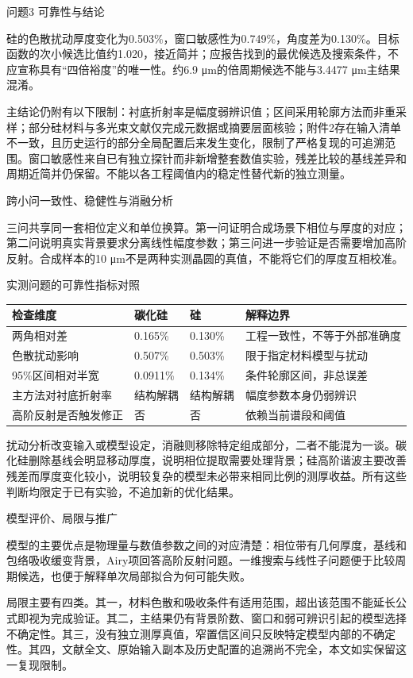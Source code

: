 问题3 可靠性与结论

硅的色散扰动厚度变化为0.503\%，窗口敏感性为0.749\%，角度差为0.130\%。目标函数的次小候选比值约1.020，接近简并；应报告找到的最优候选及搜索条件，不应宣称具有``四倍裕度''的唯一性。约6.9
μm的倍周期候选不能与3.4477 μm主结果混淆。

主结论仍附有以下限制：衬底折射率是幅度弱辨识值；区间采用轮廓方法而非重采样；部分硅材料与多光束文献仅完成元数据或摘要层面核验；附件2存在输入清单不一致，且历史运行的部分全局配置后来发生变化，限制了严格复现的可追溯范围。窗口敏感性来自已有独立探针而非新增整套数值实验，残差比较的基线差异和周期近简并仍保留。不能以各工程阈值内的稳定性替代新的独立测量。

跨小问一致性、稳健性与消融分析

三问共享同一套相位定义和单位换算。第一问证明合成场景下相位与厚度的对应；第二问说明真实背景要求分离线性幅度参数；第三问进一步验证是否需要增加高阶反射。合成样本的10
μm不是两种实测晶圆的真值，不能将它们的厚度互相校准。

实测问题的可靠性指标对照

\begin{longtable}[]{@{}llll@{}}
\toprule\noalign{}
检查维度 & 碳化硅 & 硅 & 解释边界 \\
\midrule\noalign{}
\endhead
\bottomrule\noalign{}
\endlastfoot
两角相对差 & 0.165\% & 0.130\% & 工程一致性，不等于外部准确度 \\
色散扰动影响 & 0.507\% & 0.503\% & 限于指定材料模型与扰动 \\
95\%区间相对半宽 & 0.0911\% & 0.134\% & 条件轮廓区间，非总误差 \\
主方法对衬底折射率 & 结构解耦 & 结构解耦 & 幅度参数本身仍弱辨识 \\
高阶反射是否触发修正 & 否 & 否 & 依赖当前谱段和阈值 \\
\end{longtable}

扰动分析改变输入或模型设定，消融则移除特定组成部分，二者不能混为一谈。碳化硅删除基线会明显移动厚度，说明相位提取需要处理背景；硅高阶谐波主要改善残差而厚度变化较小，说明较复杂的模型未必带来相同比例的测厚收益。所有这些判断均限定于已有实验，不追加新的优化结果。

模型评价、局限与推广

模型的主要优点是物理量与数值参数之间的对应清楚：相位带有几何厚度，基线和包络吸收缓变背景，Airy项回答高阶反射问题。一维搜索与线性子问题便于比较周期候选，也便于解释单次局部拟合为何可能失败。

局限主要有四类。其一，材料色散和吸收条件有适用范围，超出该范围不能延长公式即视为完成验证。其二，主结果仍有背景阶数、窗口和弱可辨识引起的模型选择不确定性。其三，没有独立测厚真值，窄置信区间只反映特定模型内部的不确定性。其四，文献全文、原始输入副本及历史配置的追溯尚不完全，本文如实保留这一复现限制。

